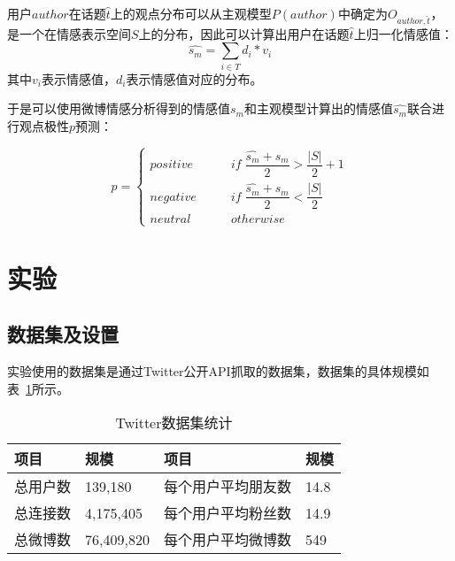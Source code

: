 用户$author$在话题$ \hat{t} $上的观点分布可以从主观模型$ P(author) $中确定为$ O_{author,\widehat{t}} $，是一个在情感表示空间$ S $上的分布，因此可以计算出用户在话题$ \hat{t} $上归一化情感值：
\begin{equation}
\hat{s_{m}}=\sum_{i \in T}d_{i}\ast v_{i}
\end{equation}
其中$ v_{i} $表示情感值，$ d_{i} $表示情感值对应的分布。

于是可以使用微博情感分析得到的情感值$s_m$和主观模型计算出的情感值$ \hat{s_{m}} $联合进行观点极性$ p $预测：

\begin{equation}
\label{polarity}
p=  
\begin{cases}
{positive} &  \qquad if \; \dfrac{\hat{s_{m}}+s_m}{2} > \dfrac{|S|}{2} +1\\
{negative} &  \qquad if \; \dfrac{\hat{s_{m}}+s_m}{2} < \dfrac{|S|}{2} \\
{neutral}  &   \qquad otherwise \;  
\end{cases}
\end{equation}

\section{实验}
\label{sec5}

\subsection{数据集及设置}
实验使用的数据集是通过Twitter公开API抓取的数据集，数据集的具体规模如表~\ref{tab5-1}所示。

\begin{table}
\centering
\caption{Twitter数据集统计}
\label{tab5-1}
\begin{tabular}{|l|l|l|l|}
\hline
项目 & 规模 & 项目 & 规模\\
\hline
总用户数& 139,180 & 每个用户平均朋友数& 14.8 \\
\hline
总连接数 &  4,175,405 & 每个用户平均粉丝数 & 14.9  \\
\hline
总微博数 & 76,409,820 & 每个用户平均微博数 & 549 \\
\hline
\end{tabular}
\end{table}

